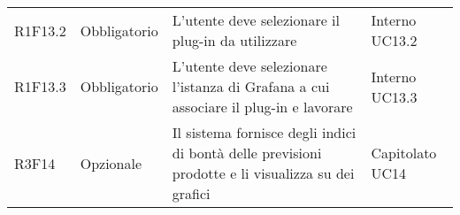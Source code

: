 \begin{longtable} {
		>{\centering}p{18mm} 
		>{\centering}p{28mm}
		>{}p{50mm} 
		>{}p{28mm}
	}
        R1F13.2 & Obbligatorio & L'utente deve selezionare il plug-in da utilizzare & Interno UC13.2 \TBstrut \\ [2mm]

		R1F13.3 & Obbligatorio & L'utente deve selezionare l'istanza di Grafana a cui associare il plug-in e lavorare & Interno UC13.3 \TBstrut \\ [2mm]

		R3F14 & Opzionale & Il sistema fornisce degli indici di bontà delle previsioni prodotte e li visualizza su dei grafici & Capitolato UC14 \TBstrut \\ [2mm]

	\end{longtable}
